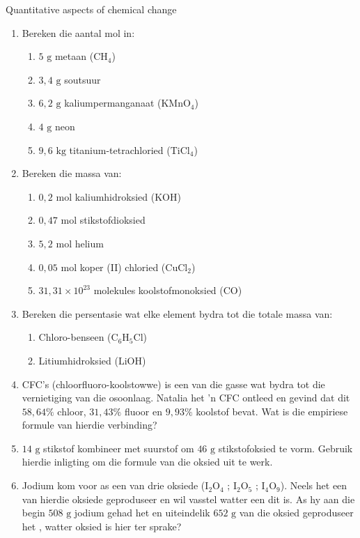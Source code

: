 \begin{eocexercises}{Quantitative aspects of chemical change}
\begin{enumerate}[noitemsep, label=\textbf{\arabic*}. ]
\item Bereken die aantal mol in:
 \begin{enumerate}[noitemsep, label=\textbf{\alph*}. ] 
 \item $5 \text{ g}$ metaan (${\text{CH}}_{4}$)
 \item $3,4 \text{ g}$ soutsuur
\item $6,2 \text{ g}$ kaliumpermanganaat (${\text{KMnO}}_{4}$)
 \item $4 \text{ g}$ neon
 \item $9,6 \text{ kg}$ titanium-tetrachloried (${\text{TiCl}}_{4}$)
 \end{enumerate}
\item Bereken die massa van:
 \begin{enumerate}[noitemsep, label=\textbf{\alph*}. ] 
 \item $0,2 \text{ mol}$ kaliumhidroksied ($\text{KOH}$)
 \item $0,47 \text{ mol}$ stikstofdioksied
 \item $5,2 \text{ mol}$ helium
 \item $0,05 \text{ mol}$ koper (II) chloried (${\text{CuCl}}_{2}$)
 \item $31,31 \times {10}^{23}$ molekules koolstofmonoksied ($\text{CO}$)\end{enumerate}
\item Bereken die persentasie wat elke element bydra tot die totale massa van:
 \begin{enumerate}[noitemsep, label=\textbf{\alph*}. ] 
 \item Chloro-benseen (${\text{C}}_{6}{\text{H}}_{5}\text{Cl}$)
 \item Litiumhidroksied ($\text{LiOH}$)
 \end{enumerate}
\item CFC's (chloorfluoro-koolstowwe) is een van die gasse wat bydra tot die vernietiging van die osoonlaag. Natalia het  'n CFC ontleed en gevind dat dit $58,64\%$ chloor, $31,43\%$ fluoor en $9,93\%$ koolstof bevat. Wat is die empiriese formule van hierdie verbinding?
\item $14 \text{ g}$ stikstof kombineer met suurstof om $46 \text{ g}$ stikstofoksied te vorm. Gebruik hierdie inligting om die formule van die oksied uit te werk.
\item Jodium kom voor as een van drie oksiede (${\text{I}}_{2}{\text{O}}_{4}$ ; ${\text{I}}_{2}{\text{O}}_{5}$ ; ${\text{I}}_{4}{\text{O}}_{9}$). Neels het een van hierdie oksiede geproduseer en wil vasstel watter een dit is. As hy aan die begin $508 \text{ g}$ jodium gehad het en uiteindelik $652 \text{ g}$ van die oksied geproduseer het , watter oksied is hier ter sprake?

\end{enumerate}
\end{eocexercises}
